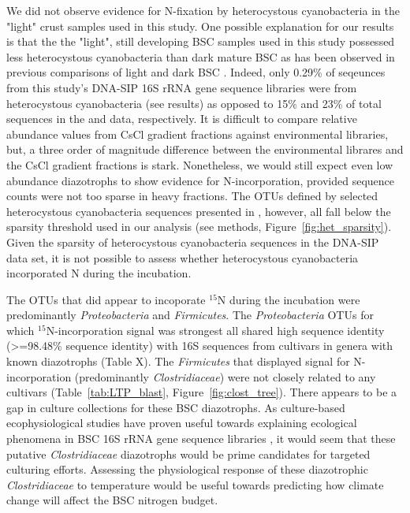 We did not observe evidence for N-fixation by heterocystous cyanobacteria in
the "light" crust samples used in this study. One possible explanation for our
results is that the the "light", still developing BSC samples used in this
study possessed less heterocystous cyanobacteria than dark mature BSC as has
been observed in previous comparisons of light and dark BSC \citep{14766579}.
Indeed, only 0.29\% of seqeunces from this study's DNA-SIP 16S rRNA gene
sequence libraries were from heterocystous cyanobacteria (see results) as
opposed to 15\% and 23\% of total sequences in the \citet{Steven_2013} and
\citet{Garcia_Pichel_2013} data, respectively. It is difficult to compare
relative abundance values from CsCl gradient fractions against environmental
libraries, but, a three order of magnitude difference between the environmental
librares and the CsCl gradient fractions is stark. Nonetheless, we would still
expect even low abundance diazotrophs to show evidence for N-incorporation,
provided sequence counts were not too sparse in heavy fractions. The OTUs
defined by selected heterocystous cyanobacteria sequences presented in
\citet{Yeager}, however, all fall below the sparsity threshold used in our
analysis (see methods, Figure~\ref{fig:het_sparsity}). Given the sparsity of
heterocystous cyanobacteria sequences in the DNA-SIP data set, it is not
possible to assess whether heterocystous cyanobacteria incorporated N during
the incubation.

The OTUs that did appear to incoporate $^{15}$N during the incubation were
predominantly \textit{Proteobacteria} and \textit{Firmicutes}. The
\textit{Proteobacteria} OTUs for which $^{15}$N-incorporation signal was
strongest all shared high sequence identity (\textgreater=98.48\% sequence
identity) with 16S
sequences from cultivars in genera with known diazotrophs (Table X). The
\textit{Firmicutes} that displayed signal for N-incorporation (predominantly
\textit{Clostridiaceae}) were not closely related to any cultivars
(Table~\ref{tab:LTP_blast}, Figure~\ref{fig:clost_tree}). There appears to be a
gap in culture collections for these BSC diazotrophs. As culture-based
ecophysiological studies have proven useful towards explaining ecological
phenomena in BSC 16S rRNA gene sequence libraries \citep{Garcia_Pichel_2013},
it would seem that these putative \textit{Clostridiaceae} diazotrophs would be
prime candidates for targeted culturing efforts. Assessing the physiological
response of these diazotrophic \textit{Clostridiaceae} to temperature would be
useful towards predicting how climate change will affect the BSC nitrogen
budget. 

